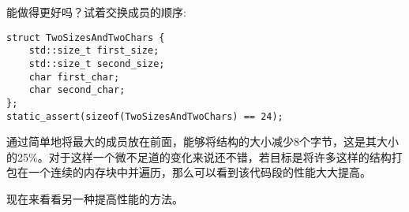 能做得更好吗？试着交换成员的顺序:

\begin{lstlisting}[style=styleCXX]
struct TwoSizesAndTwoChars {
	std::size_t first_size;
	std::size_t second_size;
	char first_char;
	char second_char;
};
static_assert(sizeof(TwoSizesAndTwoChars) == 24);
\end{lstlisting}

通过简单地将最大的成员放在前面，能够将结构的大小减少8个字节，这是其大小的25\%。对于这样一个微不足道的变化来说还不错，若目标是将许多这样的结构打包在一个连续的内存块中并遍历，那么可以看到该代码段的性能大大提高。

现在来看看另一种提高性能的方法。














